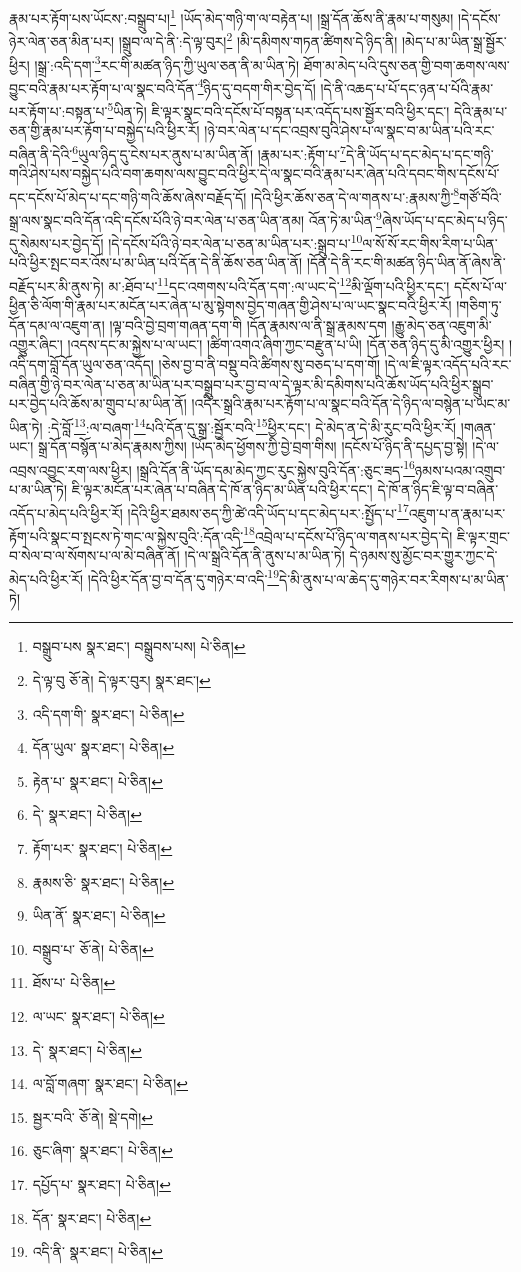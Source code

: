 རྣམ་པར་རྟོག་པས་ཡོངས་:བསྒྲུབ་པ།\footnote{བསྒྲུབ་པས  སྣར་ཐང་། བསྒྲུབས་པས།  པེ་ཅིན། } །ཡོད་མེད་གཉི་ག་ལ་བརྟེན་པ། །སྒྲ་དོན་ཆོས་ནི་རྣམ་པ་གསུམ། །དེ་དངོས་ཉེར་ལེན་ཅན་མིན་པར། །སྒྲུབ་ལ་དེ་ནི་:དེ་ལྟ་བུར།\footnote{དེ་ལྟ་བུ  ཅོ་ནེ། དེ་ལྟར་བུར།  སྣར་ཐང་། } །མི་དམིགས་གཏན་ཚིགས་དེ་ཉིད་ནི། །མེད་པ་མ་ཡིན་སྒྲ་སྦྱོར་ཕྱིར། །སྒྲ་:འདི་དག་\footnote{འདི་དག་གི་  སྣར་ཐང་།  པེ་ཅིན། }རང་གི་མཚན་ཉིད་ཀྱི་ཡུལ་ཅན་ནི་མ་ཡིན་ཏེ། ཐོག་མ་མེད་པའི་དུས་ཅན་གྱི་བག་ཆགས་ལས་བྱུང་བའི་རྣམ་པར་རྟོག་པ་ལ་སྣང་བའི་དོན་\footnote{དོན་ཡུལ་  སྣར་ཐང་།  པེ་ཅིན། }ཉིད་དུ་བདག་གིར་བྱེད་དོ། །དེ་ནི་འཆད་པ་པོ་དང་ཉན་པ་པོའི་རྣམ་པར་རྟོག་པ་:བསྟན་པ་\footnote{རྟེན་པ་  སྣར་ཐང་།  པེ་ཅིན། }ཡིན་ཏེ། ཇི་ལྟར་སྣང་བའི་དངོས་པོ་བསྟན་པར་འདོད་པས་སྦྱོར་བའི་ཕྱིར་དང་། དེའི་རྣམ་པ་ཅན་གྱི་རྣམ་པར་རྟོག་པ་བསྐྱེད་པའི་ཕྱིར་རོ། །ཉེ་བར་ལེན་པ་དང་འབྲས་བུའི་ཤེས་པ་ལ་སྣང་བ་མ་ཡིན་པའི་རང་བཞིན་ནི་དེའི་\footnote{དེ་  སྣར་ཐང་།  པེ་ཅིན། }ཡུལ་ཉིད་དུ་ངེས་པར་ནུས་པ་མ་ཡིན་ནོ། །རྣམ་པར་:རྟོག་པ་\footnote{རྟོག་པར་  སྣར་ཐང་།  པེ་ཅིན། }དེ་ནི་ཡོད་པ་དང་མེད་པ་དང་གཉི་གའི་ཤེས་པས་བསྐྱེད་པའི་བག་ཆགས་ལས་བྱུང་བའི་ཕྱིར་དེ་ལ་སྣང་བའི་རྣམ་པར་ཞེན་པའི་དབང་གིས་དངོས་པོ་དང་དངོས་པོ་མེད་པ་དང་གཉི་གའི་ཆོས་ཞེས་བརྗོད་དོ། །དེའི་ཕྱིར་ཆོས་ཅན་དེ་ལ་གནས་པ་:རྣམས་ཀྱི་\footnote{རྣམས་ཅི་  སྣར་ཐང་།  པེ་ཅིན། }གཙོ་བོའི་སྒྲ་ལས་སྣང་བའི་དོན་འདི་དངོས་པོའི་ཉེ་བར་ལེན་པ་ཅན་ཡིན་ནམ། འོན་ཏེ་མ་ཡིན་\footnote{ཡིན་ནོ་  སྣར་ཐང་།  པེ་ཅིན། }ཞེས་ཡོད་པ་དང་མེད་པ་ཉིད་དུ་སེམས་པར་བྱེད་དོ། །དེ་དངོས་པོའི་ཉེ་བར་ལེན་པ་ཅན་མ་ཡིན་པར་:སྒྲུབ་པ་\footnote{བསྒྲུབ་པ་  ཅོ་ནེ།  པེ་ཅིན། }ལ་སོ་སོ་རང་གིས་རིག་པ་ཡིན་པའི་ཕྱིར་སྤང་བར་འོས་པ་མ་ཡིན་པའི་དོན་དེ་ནི་ཆོས་ཅན་ཡིན་ནོ། །དོན་དེ་ནི་རང་གི་མཚན་ཉིད་ཡིན་ནོ་ཞེས་ནི་བརྗོད་པར་མི་ནུས་ཏེ། མ་:ཐོབ་པ་\footnote{ཐོས་པ་  པེ་ཅིན། }དང་འགགས་པའི་དོན་དག་:ལ་ཡང་དེ་\footnote{ལ་ཡང་  སྣར་ཐང་།  པེ་ཅིན། }མི་ལྡོག་པའི་ཕྱིར་དང་། དངོས་པོ་ལ་ཕྱིན་ཅི་ལོག་གི་རྣམ་པར་མངོན་པར་ཞེན་པ་མུ་སྟེགས་བྱེད་གཞན་གྱི་ཤེས་པ་ལ་ཡང་སྣང་བའི་ཕྱིར་རོ། །གཅིག་ཏུ་དོན་དམ་ལ་འཇུག་ན། །ལྟ་བའི་བྱེ་བྲག་གཞན་དག་གི །དོན་རྣམས་ལ་ནི་སྒྲ་རྣམས་དག །རྒྱུ་མེད་ཅན་འཇུག་མི་འགྱུར་ཞིང་། །འདས་དང་མ་སྐྱེས་པ་ལ་ཡང་། །ཚིག་འགའ་ཞིག་ཀྱང་བརྫུན་པ་ཡི། །དོན་ཅན་ཉིད་དུ་མི་འགྱུར་ཕྱིར། །འདི་དག་བློ་དོན་ཡུལ་ཅན་འདོད། །ཅེས་བྱ་བ་ནི་བསྡུ་བའི་ཚིགས་སུ་བཅད་པ་དག་གོ། །དེ་ལ་ཇི་ལྟར་འདོད་པའི་རང་བཞིན་གྱི་ཉེ་བར་ལེན་པ་ཅན་མ་ཡིན་པར་བསྒྲུབ་པར་བྱ་བ་ལ་དེ་ལྟར་མི་དམིགས་པའི་ཆོས་ཡོད་པའི་ཕྱིར་སྒྲུབ་པར་བྱེད་པའི་ཆོས་མ་གྲུབ་པ་མ་ཡིན་ནོ། །འདིར་སྒྲའི་རྣམ་པར་རྟོག་པ་ལ་སྣང་བའི་དོན་དེ་ཉིད་ལ་བསྙེན་པ་ཡང་མ་ཡིན་ཏེ། :དེ་བློ་\footnote{དེ་  སྣར་ཐང་།  པེ་ཅིན། }:ལ་བཞག་\footnote{ལ་བློ་གཞག་  སྣར་ཐང་།  པེ་ཅིན། }པའི་དོན་དུ་སྒྲ་:སྦྱོར་བའི་\footnote{སྦྱར་བའི་  ཅོ་ནེ།  སྡེ་དགེ། }ཕྱིར་དང་། དེ་མེད་ན་དེ་མི་རུང་བའི་ཕྱིར་རོ། །གཞན་ཡང་། སྒྲ་དོན་བསྙོན་པ་མེད་རྣམས་ཀྱིས། །ཡོད་མེད་ཕྱོགས་ཀྱི་བྱེ་བྲག་གིས། །དངོས་པོ་ཉིད་ནི་དཔྱད་བྱ་སྟེ། །དེ་ལ་འབྲས་འབྱུང་རག་ལས་ཕྱིར། །སྒྲའི་དོན་ནི་ཡོད་དམ་མེད་ཀྱང་རུང་སྐྱེས་བུའི་དོན་:ཅུང་ཟད་\footnote{ཅུང་ཞིག་  སྣར་ཐང་།  པེ་ཅིན། }ཉམས་པའམ་འགྲུབ་པ་མ་ཡིན་ཏེ། ཇི་ལྟར་མངོན་པར་ཞེན་པ་བཞིན་དེ་ཁོ་ན་ཉིད་མ་ཡིན་པའི་ཕྱིར་དང་། དེ་ཁོ་ན་ཉིད་ཇི་ལྟ་བ་བཞིན་འདོད་པ་མེད་པའི་ཕྱིར་རོ། །དེའི་ཕྱིར་ཐམས་ཅད་ཀྱི་ཚེ་འདི་ཡོད་པ་དང་མེད་པར་:སྤྱོད་པ་\footnote{དཔྱོད་པ་  སྣར་ཐང་།  པེ་ཅིན། }འཇུག་པ་ན་རྣམ་པར་རྟོག་པའི་སྣང་བ་སྤངས་ཏེ་གང་ལ་སྐྱེས་བུའི་:དོན་འདི་\footnote{དོན་  སྣར་ཐང་།  པེ་ཅིན། }འབྲེལ་པ་དངོས་པོ་ཉིད་ལ་གནས་པར་བྱེད་དེ། ཇི་ལྟར་གྲང་བ་སེལ་བ་ལ་སོགས་པ་ལ་མེ་བཞིན་ནོ། །དེ་ལ་སྒྲའི་དོན་ནི་ནུས་པ་མ་ཡིན་ཏེ། དེ་ཉམས་སུ་མྱོང་བར་གྱུར་ཀྱང་དེ་མེད་པའི་ཕྱིར་རོ། །དེའི་ཕྱིར་དོན་བྱ་བ་དོན་དུ་གཉེར་བ་འདི་\footnote{འདི་ནི་  སྣར་ཐང་།  པེ་ཅིན། }དེ་མི་ནུས་པ་ལ་ཆེད་དུ་གཉེར་བར་རིགས་པ་མ་ཡིན་ཏེ། 